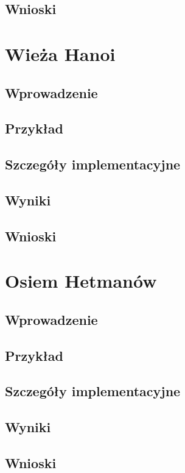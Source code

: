     \subsection{Wnioski}
\section{Wieża Hanoi}
    \subsection{Wprowadzenie}
    \subsection{Przykład}
    \subsection{Szczegóły implementacyjne}
    \subsection{Wyniki}
    \subsection{Wnioski}
\section{Osiem Hetmanów}
\label{OsiemHetmanowTest}
    \subsection{Wprowadzenie}
    \subsection{Przykład}
    \subsection{Szczegóły implementacyjne}
    \subsection{Wyniki}
    \subsection{Wnioski}